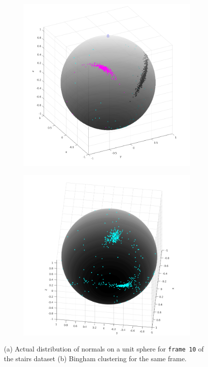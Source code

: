\documentclass[12pt]{article}
\begin{document}
\begin{itemize}
\begin{figure}[H]
\centering
\begin{subfigure}{.5\textwidth}
  \centering
  \includegraphics[width=\linewidth]{real_normals}
\end{subfigure}%
\begin{subfigure}{.5\textwidth}
  \centering
  \includegraphics[width=\linewidth]{normals_fail}
\end{subfigure}
\caption{(a) Actual distribution of normals on a unit sphere for \texttt{frame 10} of the stairs dataset (b) Bingham clustering for the same frame.}
\label{fig:stairs_bingham}
\end{figure}


\end{itemize}
\end{document}
